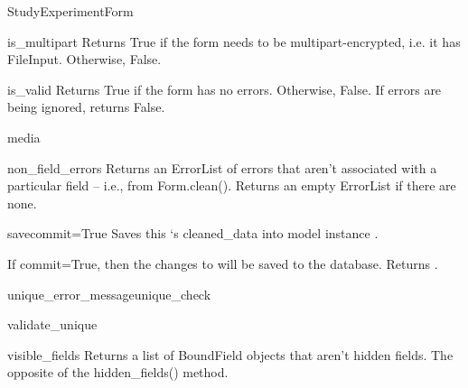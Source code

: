\documentclass[letterpaper,10pt,english]{sphinxmanual}
\begin{document}
\begin{classdesc}{StudyExperimentForm}
\hypertarget{data.forms.StudyExperimentForm.is_multipart}{}\begin{methoddesc}[StudyExperimentForm]{is\_multipart}{}
Returns True if the form needs to be multipart-encrypted, i.e. it has
FileInput. Otherwise, False.
\end{methoddesc}

\hypertarget{data.forms.StudyExperimentForm.is_valid}{}\begin{methoddesc}[StudyExperimentForm]{is\_valid}{}
Returns True if the form has no errors. Otherwise, False. If errors are
being ignored, returns False.
\end{methoddesc}

\hypertarget{data.forms.StudyExperimentForm.media}{}\begin{memberdesc}[StudyExperimentForm]{media}\end{memberdesc}

\hypertarget{data.forms.StudyExperimentForm.non_field_errors}{}\begin{methoddesc}[StudyExperimentForm]{non\_field\_errors}{}
Returns an ErrorList of errors that aren't associated with a particular
field -- i.e., from Form.clean(). Returns an empty ErrorList if there
are none.
\end{methoddesc}

\hypertarget{data.forms.StudyExperimentForm.save}{}\begin{methoddesc}[StudyExperimentForm]{save}{commit=True}
Saves this `s cleaned\_data into model instance
.

If commit=True, then the changes to  will be saved to the
database. Returns .
\end{methoddesc}

\hypertarget{data.forms.StudyExperimentForm.unique_error_message}{}\begin{methoddesc}[StudyExperimentForm]{unique\_error\_message}{unique\_check}\end{methoddesc}

\hypertarget{data.forms.StudyExperimentForm.validate_unique}{}\begin{methoddesc}[StudyExperimentForm]{validate\_unique}{}\end{methoddesc}

\hypertarget{data.forms.StudyExperimentForm.visible_fields}{}\begin{methoddesc}[StudyExperimentForm]{visible\_fields}{}
Returns a list of BoundField objects that aren't hidden fields.
The opposite of the hidden\_fields() method.
\end{methoddesc}
\end{classdesc}
\end{document}
